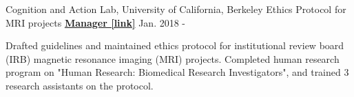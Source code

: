 \begin{cventries}
  \cventry 
    {Cognition and Action Lab, University of California, Berkeley} %
    {Ethics Protocol for MRI projects}
    {\href{https://drive.google.com/file/d/1h66emU7-TRl-mSLZTEH01E3Qf5ZpEdbv/view?usp=sharing}{\textbf{Manager [link]}}} %
    {Jan. 2018 - } %
    {
      \begin{cvitems} %
      	\item {Drafted guidelines and maintained ethics protocol for institutional review board (IRB) magnetic resonance imaging (MRI) projects. Completed human research program on "Human Research: Biomedical Research Investigators", and trained 3 research assistants on the protocol.}
      \end{cvitems}
    }
    
\end{cventries}
    


